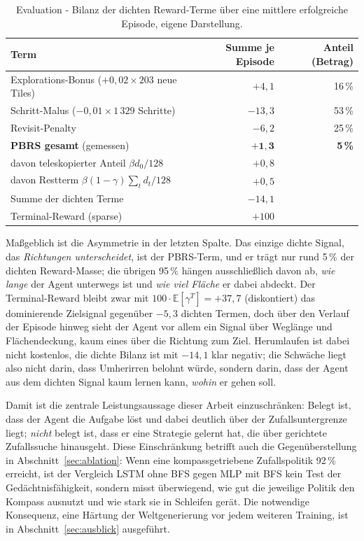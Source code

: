 \documentclass[11pt,a4paper]{article}
\begin{document}
\begin{table}[h]
\centering
\small
\begin{tabular}{@{}lrr@{}}
\toprule
\textbf{Term} & \textbf{Summe je Episode} & \textbf{Anteil (Betrag)} \\
\midrule
Explorations-Bonus ($+0{,}02 \times 203$ neue Tiles) & $+4{,}1$ & 16\,\% \\
Schritt-Malus ($-0{,}01 \times 1\,329$ Schritte)     & $-13{,}3$ & 53\,\% \\
Revisit-Penalty                                      & $-6{,}2$ & 25\,\% \\
\midrule
\textbf{PBRS gesamt} (gemessen)                      & $\mathbf{+1{,}3}$ & \textbf{5\,\%} \\
\quad davon teleskopierter Anteil $\beta d_0/128$    & $+0{,}8$ & \\
\quad davon Restterm $\beta(1-\gamma)\sum_t d_t/128$ & $+0{,}5$ & \\
\midrule
Summe der dichten Terme & $-14{,}1$ & \\
Terminal-Reward (sparse) & $+100$ & \\
\bottomrule
\end{tabular}
\caption[Bilanz der dichten Reward-Terme]{Evaluation - Bilanz der dichten
Reward-Terme über eine mittlere erfolgreiche Episode, eigene Darstellung.}
\label{tab:rewardbilanz}
\end{table}

Maßgeblich ist die Asymmetrie in der letzten Spalte. Das einzige dichte
Signal, das \emph{Richtungen unterscheidet}, ist der PBRS-Term, und er trägt
nur rund 5\,\% der dichten Reward-Masse; die übrigen 95\,\% hängen
ausschließlich davon ab, \emph{wie lange} der Agent unterwegs ist und
\emph{wie viel Fläche} er dabei abdeckt. Der Terminal-Reward bleibt zwar mit
$100 \cdot \mathbb{E}[\gamma^{T}] = +37{,}7$ (diskontiert) das dominierende
Zielsignal gegenüber $-5{,}3$ dichten Termen, doch über den Verlauf der
Episode hinweg sieht der Agent vor allem ein Signal über Weglänge und
Flächendeckung, kaum eines über die Richtung zum Ziel. Herumlaufen ist dabei
nicht kostenlos, die dichte Bilanz ist mit $-14{,}1$ klar negativ; die
Schwäche liegt also nicht darin, dass Umherirren belohnt würde, sondern
darin, dass der Agent aus dem dichten Signal kaum lernen kann, \emph{wohin}
er gehen soll.

Damit ist die zentrale Leistungsaussage dieser Arbeit einzuschränken: Belegt
ist, dass der Agent die Aufgabe löst und dabei deutlich über der
Zufallsuntergrenze liegt; \emph{nicht} belegt ist, dass er eine Strategie
gelernt hat, die über gerichtete Zufallssuche hinausgeht. Diese Einschränkung
betrifft auch die Gegenüberstellung in Abschnitt~\ref{sec:ablation}: Wenn eine
kompassgetriebene Zufallspolitik 92\,\% erreicht, ist der Vergleich
\glqq LSTM ohne BFS\grqq{} gegen \glqq MLP mit BFS\grqq{} kein Test der
Gedächtnisfähigkeit, sondern misst überwiegend, wie gut die jeweilige Politik
den Kompass ausnutzt und wie stark sie in Schleifen gerät. Die notwendige
Konsequenz, eine Härtung der Weltgenerierung vor jedem weiteren Training, ist
in Abschnitt~\ref{sec:ausblick} ausgeführt.
\end{document}
